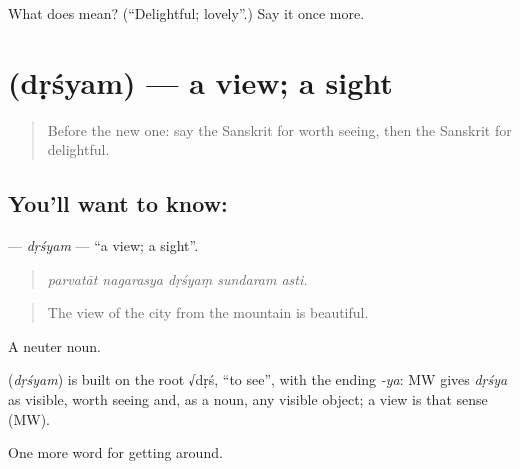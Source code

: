 \begin{tcolorbox}[breakable,colback=teal!4,colframe=teal!35!black,title={Before you move on}]
What does  mean? (\textquotedblleft{}Delightful; lovely\textquotedblright{}.) Say it once more.
\end{tcolorbox}
\section[\texorpdfstring{\sk{दृश्यम्} (dṛśyam)}{दृश्यम् (dṛśyam)}]{ (dṛśyam) — a view; a sight}

\label{lesson:SA-C424-drsyam}



\begin{quote}
Before the new one: say the Sanskrit for worth seeing, then the Sanskrit for delightful.
\end{quote}

\subsection*{You'll want to know: }
\textbf{} — \emph{dṛśyam} — \textquotedblleft{}a view; a sight\textquotedblright{}.

\begin{quote}
    
\end{quote}

\begin{quote}
\emph{parvatāt nagarasya dṛśyaṃ sundaram asti.}
\end{quote}

\begin{quote}
The view of the city from the mountain is beautiful.
\end{quote}

A neuter noun.

\begin{cousinweb}
\textbf{} (\emph{dṛśyam}) is built on the root √dṛś, \textquotedblleft{}to see\textquotedblright{}, with the ending \emph{-ya}: MW gives \emph{dṛśya} as visible, worth seeing and, as a noun, any visible object; a view is that sense (MW).
\end{cousinweb}

\begin{grammarlens}[title={What you've built}]
One more word for getting around.
\end{grammarlens}


